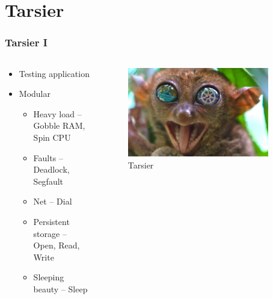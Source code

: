 \section{Tarsier}    
    \begin{frame}    
      \frametitle{Tarsier I}
      \begin{columns}
        \begin{column}{0.48\textwidth}
          \begin{itemize}
            \item Testing application
            \item Modular
              \begin{itemize}
                \item \textcolor{myred}{Heavy load} -- Gobble RAM, Spin CPU  
                \item \textcolor{myred}{Faults} -- Deadlock, Segfault
                \item \textcolor{myred}{Net} -- Dial
                \item \textcolor{myred}{Persistent storage} -- Open, Read, Write
                \item \textcolor{myred}{Sleeping beauty} -- Sleep 
              \end{itemize}
          \end{itemize}        
         \end{column}
         \begin{column}{0.48\textwidth}    
          \begin{figure}[htb]
    			  \begin{center}
    				  \includegraphics[width=0.9\textwidth]{img/tarsier.png}
    				  \caption{Tarsier \cite{tarsier-source}}
    			  \end{center}
    		  \end{figure}
         \end{column}
      \end{columns}
    \end{frame}
    
